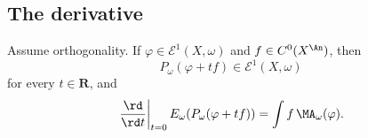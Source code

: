 \subsection{The derivative}
\label{sec:ch27-e1-derivative}

\begin{corollary}\label{cor:e1-projected-variation}
Assume orthogonality. If
\(\varphi\in\mathcal E^1(X,\omega)\) and \(f\in C^0(X^{\An})\), then
\[
 P_\omega(\varphi+tf)\in\mathcal E^1(X,\omega)
\]
for every \(t\in\mathbf R\), and
\begin{equation}\label{eq:e1-projected-derivative}
 \left.\frac{\rd}{\rd t}\right|_{t=0}
 E_\omega(P_\omega(\varphi+tf))
 =\int f\,\MA_\omega(\varphi).
\end{equation}
\end{corollary}

